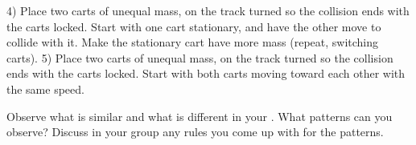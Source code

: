 4)	Place two carts of unequal mass, on the track turned so the collision ends with the carts locked. Start with one cart stationary, and have the other move to collide with it. Make the stationary cart have more mass (repeat, switching carts). 
5)	Place two carts of unequal mass, on the track turned so the collision ends with the carts locked. Start with both carts moving toward each other with the same speed.

Observe what is similar and what is different in your \pcharts{}. What patterns can you observe? Discuss in your group any rules you come up with for the patterns.	
\WCD







 
